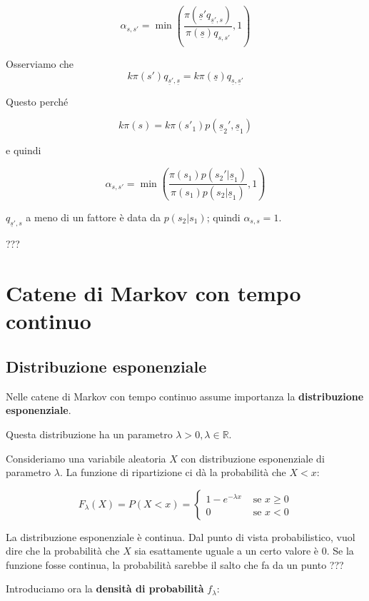 \documentclass[a4paper,12pt]{book}
\begin{document}
$$ \alpha_{s,s'} = \min\left( \frac{\pi(\underline{s}' q_{\underline{s}', s})}{\pi(\underline{s}) q_{s,s'}} , 1   \right) $$ %

Osserviamo che 
$$ k\pi(s') q_{\underline{s}', \underline{s}} = k\pi(\underline{s}) q_{\underline{s}, \underline{s}'} $$

Questo perché

$$ k\pi(s) = k\pi(s'_1)p(\underline{s}_2', \underline{s}_1) $$ %

e quindi 

$$ \alpha_{s,s'} = \min \left(\frac{\pi(s_1)p(s_2' | \underline{s}_1)}{\pi(s_1)p(s_2 | \underline{s}_1)}, 1\right) $$

$ q_{\underline{s}', s} $ a meno di un fattore %
è data da $ p(s_2 | s_1) $; quindi $\alpha_{s,s} = 1$. %

??? %

\chapter{Catene di Markov con tempo continuo}

\section{Distribuzione esponenziale}

Nelle catene di Markov con tempo continuo assume importanza la \textbf{distribuzione esponenziale}. 

Questa distribuzione ha un parametro $\lambda > 0, \lambda \in \mathbb{R}$. 

Consideriamo una variabile aleatoria $ X $ con distribuzione esponenziale di parametro $\lambda$. La funzione di ripartizione ci dà la probabilità che $ X < x $:

$$ F_\lambda (X) = P(X < x) = 
\begin{cases}
	1 - e^{ - \lambda x} & \text{ se } x \ge 0 \\
	0 & \text{ se } x < 0
\end{cases} $$

La distribuzione esponenziale è continua. Dal punto di vista probabilistico, vuol dire che la probabilità che $ X $ sia esattamente uguale a un certo valore è 0. Se la funzione fosse continua, la probabilità sarebbe il salto che fa da un punto ??? %

Introduciamo ora la \textbf{densità di probabilità} $ f_\lambda $:
\end{document}
